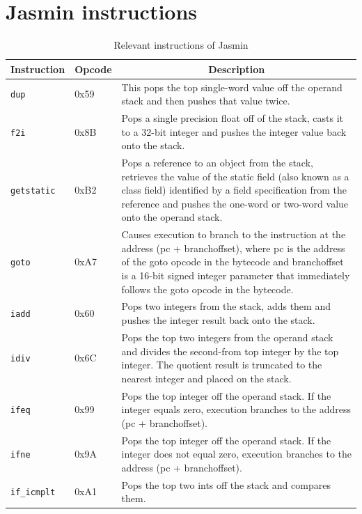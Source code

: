 \newpage

\section*{Jasmin instructions}
\label{sec:jasmin_instructions}
\begin{table}[bth]
	\centering
	\caption{Relevant instructions of Jasmin}
	\label{tab:jasmin_instructions}
	\begin{tabular}{|l|l|p{10cm}|}
		\hline
		\multicolumn{1}{|c|}{\textbf{Instruction}} & \multicolumn{1}{|c|}{\textbf{Opcode}} & \multicolumn{1}{|c|}{\textbf{Description}} \\\hline
		\texttt{dup} & 0x59 & This pops the top single-word value off the operand stack and then pushes that value twice. \\\hline
		\texttt{f2i} & 0x8B & Pops a single precision float off of the stack, casts it to a 32-bit integer and pushes the integer value back onto the stack. \\\hline
		\texttt{getstatic} & 0xB2 & Pops a reference to an object from the stack, retrieves the value of the static field (also known as a class field) identified by a field specification from the reference and pushes the one-word or two-word value onto the operand stack. \\\hline
		\texttt{goto} & 0xA7 & Causes execution to branch to the instruction at the address (pc + branchoffset), where pc is the address of the goto opcode in the bytecode and branchoffset is a 16-bit signed integer parameter that immediately follows the goto opcode in the bytecode. \\\hline
		\texttt{iadd} & 0x60 & Pops two integers from the stack, adds them and pushes the integer result back onto the stack. \\\hline
		\texttt{idiv} & 0x6C & Pops the top two integers from the operand stack and divides the second-from top integer by the top integer. The quotient result is truncated to the nearest integer and placed on the stack. \\\hline
		\texttt{ifeq} & 0x99 & Pops the top integer off the operand stack. If the integer equals zero, execution branches to the address (pc + branchoffset).\\\hline
		\texttt{ifne} & 0x9A & Pops the top integer off the operand stack. If the integer does not equal zero, execution branches to the address (pc + branchoffset).\\\hline
		\texttt{if\_icmplt} & 0xA1 & Pops the top two ints off the stack and compares them.\\\hline

\end{tabular}
\end{table}
